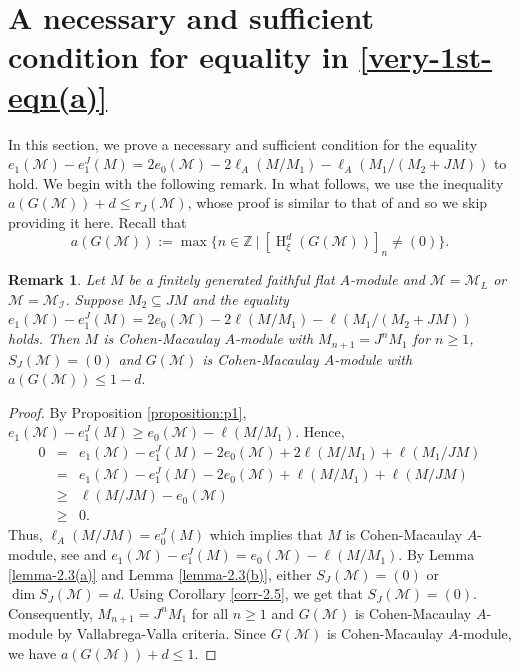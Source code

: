\documentclass[11pt,reqno]{amsart}
\newtheorem{remark}[theorem]{Remark}
\theoremstyle{definition}
\def\M{{\mathcal M}}
\def\I{{\mathcal I}}
\DeclareMathOperator{\h}{H}
\numberwithin{equation}{section}
\begin{document}
\section{\texorpdfstring
{A necessary and sufficient condition for equality in \eqref{very-1st-eqn(a)}}
{A necessary and sufficient condition for equality in the inequality}
}\label{Section-proof-1}
In this section, we prove a necessary and sufficient condition for the equality
$e_1(\M)-e_1^J(M)=2e_0(\M)-2\ell_A(M/M_1)-\ell_A(M_1/(M_2+JM))$ to hold. 
We begin with the following remark. In what follows, we use the inequality $a(G(\M))+d\leq r_J(\M)$,
whose proof is similar to that of \cite[Proposition 3.2]{nvt} and so we skip providing it here. Recall that 
 $$a(G(\M)):=\max\{n\in \mathbb{Z}~|~ [\h_\xi^d(G(\M))]_n\neq (0)\}.$$

\begin{remark}\label{remark-5.1}Let $M$ be a finitely generated faithful flat $A$-module and $\M= \M_L$ or $\M=\M_\I.$
	Suppose $M_2\subseteq JM$ and  the equality $e_1(\M)-e_1^J(M)=2e_0(\M)-2\ell(M/M_1)-\ell(M_1/(M_2+JM))$ holds. Then
	$M$ is Cohen-Macaulay $A$-module with 
	$M_{n+1}=J^nM_1$ for $n\geq 1$,  $S_J(\M)=(0)$ and $G(\mathcal{M})$ is Cohen-Macaulay $A$-module with $a(G(\M))\leq 1-d.$ 
\end{remark}
\begin{proof}
	By Proposition \ref{proposition:p1},  $e_1(\M)-e_1^J(M)\geq e_0(\M)-\ell(M/M_1)$. Hence,
	\begin{eqnarray*}
		0&=& e_1(\M)-e_1^J(M)-2e_0(\M)+2\ell(M/M_1)+\ell(M_1/JM)\\
		&=&e_1(\M)-e_1^J(M)-2e_0(\M)+\ell(M/M_1)+\ell(M/JM)\\
		&\geq& \ell(M/JM)-e_0(\M)\\
		&\geq& 0.
	\end{eqnarray*}
	Thus, $\ell_A(M/JM)=e_0^J(M)$ which implies that $M$ is Cohen-Macaulay $A$-module, see \cite[Corollary 4.7.11]{bruns-herzog} and $e_1(\M)-e_1^J(M)=e_0(\M)-\ell(M/M_1)$. By Lemma \ref{lemma-2.3(a)} and Lemma \ref{lemma-2.3(b)}, either $S_J(\M)=(0)$ or $\dim S_J(\M)=d$. Using Corollary \ref{corr-2.5}, we get that $S_J(\M)=(0)$.
	 Consequently, $M_{n+1}=J^nM_1$ for
	all $n\geq 1$ and 
	$G(\M)$ is Cohen-Macaulay $A$-module by Vallabrega-Valla criteria. Since $G(\M)$ is Cohen-Macaulay $A$-module, we have $a(G(\M))+d\leq 1$. 
\end{proof}
\end{document}
